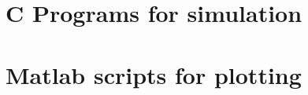 \documentclass[11pt, oneside]{article}   	%
\begin{document}
\pagebreak
\appendix
\section{C Programs for simulation}


\section{Matlab scripts for plotting}


\end{document}
